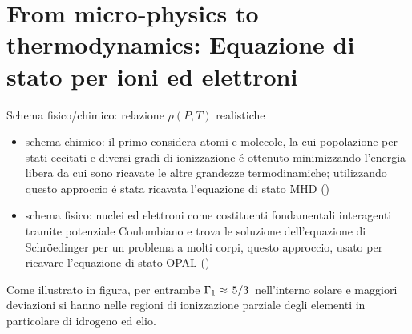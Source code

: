 \section{From micro-physics to thermodynamics: Equazione di stato per ioni ed elettroni}


\begin{wordonframe}{Schema fisico/chimico: relazione $\rho(P,T)$ realistiche}
\begin{itemize}
\item schema  chimico: il primo considera atomi e molecole, la cui popolazione per stati eccitati e diversi gradi di ionizzazione \'e ottenuto minimizzando l'energia libera da cui sono ricavate le altre grandezze termodinamiche; utilizzando questo approccio \'e stata ricavata l'equazione di stato MHD (\cite{hummer1988equation})
\item schema fisico: nuclei ed elettroni come costituenti fondamentali interagenti tramite potenziale Coulombiano e trova le soluzione dell'equazione di Schr\"oedinger per un problema a molti corpi, questo approccio, usato per ricavare l'equazione di stato OPAL (\cite{rogers1986occupation})
\end{itemize}
Come illustrato in figura, per entrambe $\Gamma_1\approx\left.{5}\middle/{3}\right.$ nell'interno solare e maggiori deviazioni si hanno nelle regioni di ionizzazione parziale degli elementi in particolare di idrogeno ed elio.
\end{wordonframe}

